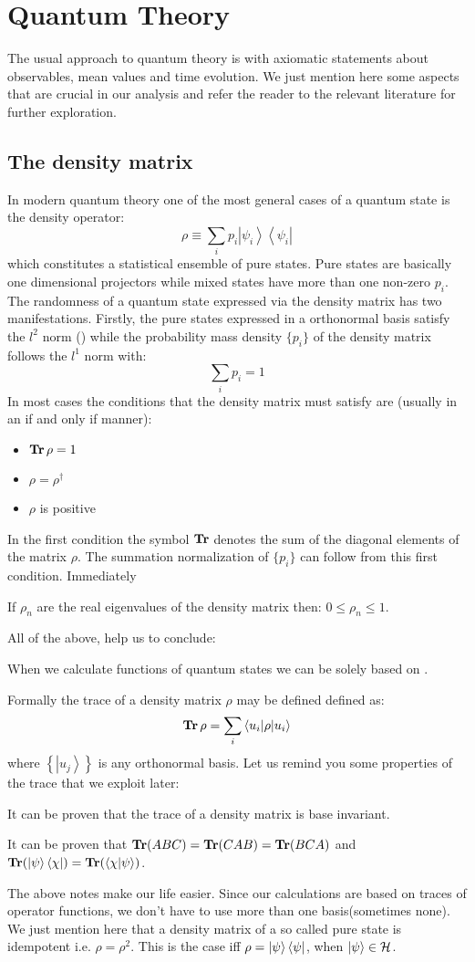 \section{Quantum Theory}
The usual approach to quantum theory is with axiomatic statements about observables, mean values and time evolution. We just mention here some aspects that are crucial in our analysis and refer the reader to the relevant literature for further exploration.
\subsection{The density matrix}
In modern quantum theory one of the most general cases of a quantum state is the density operator:
$$
\rho \equiv \sum_{i} p_{i}\left|\psi_{i}\right\rangle\left\langle\psi_{i}\right|
$$
which constitutes a statistical ensemble of pure states. Pure states are basically one dimensional projectors while mixed states have more than one non-zero $p_i$. The randomness of a quantum state expressed via the density matrix has two manifestations. Firstly, the  pure states expressed in a orthonormal basis satisfy the $l^2$ norm (\cite{ballentine2014quantum}) while the probability mass density $\{ p_i\}$ of the density matrix follows the $l^1$ norm with:
$$
\sum_{i} p_{i}=1
$$
In most cases the conditions that the density matrix must satisfy are (usually in an if and only if manner):
\begin{itemize}
\item $\operatorname{\textup{\textbf{Tr}}} \rho=1$
\item $\rho=\rho^{\dagger}$
\item $\rho$ is positive
\end{itemize}
In the first condition the symbol $\operatorname{\textup{\textbf{Tr}}}$ denotes the sum of the diagonal elements of the matrix $\rho$. The summation normalization of $\{p_i\}$ can follow from this first condition. Immediately
\begin{note}
If $\rho_n$ are the real eigenvalues of the density matrix then: $0 \leq \rho_{n} \leq 1$.
\end{note}
\noindent
All of the above, help us to conclude:
\begin{note}
When we calculate functions of quantum states we can be solely based on .
\end{note}
Formally the trace of a density matrix $\rho$ may be defined defined as:
$$
\operatorname{\textup{\textbf{Tr}}} \rho =\sum_{i}\left\langle u_{i}|\rho| u_{i} \right\rangle
$$
where $\left\{\left|u_{j}\right\rangle\right\}$ is any orthonormal basis.
Let us remind you some properties of the trace that we exploit later:
\begin{note}
It can be proven that the trace of a density matrix is base invariant.
\end{note}
\begin{note}
It can be proven that $\operatorname{\textup{\textbf{Tr}}}(ABC)=\operatorname{\textup{\textbf{Tr}}} (CAB)=\operatorname{\textup{\textbf{Tr}}}(BCA)$ and $\operatorname{\textup{\textbf{Tr}}}(\ket{\psi}\bra{\chi})=\operatorname{\textup{\textbf{Tr}}}(\braket{\chi | \psi})$.
\end{note}
\noindent
The above notes make our life easier. Since our calculations are based on traces of operator functions, we don't have to use more than one basis(sometimes none). 
We just mention here that a density matrix of a so called pure state is idempotent i.e. $\rho=\rho^2$. This is the case iff $\rho=\ket{\psi}\bra{\psi}$, when $\ket{\psi} \in \mathcal{H}$.
